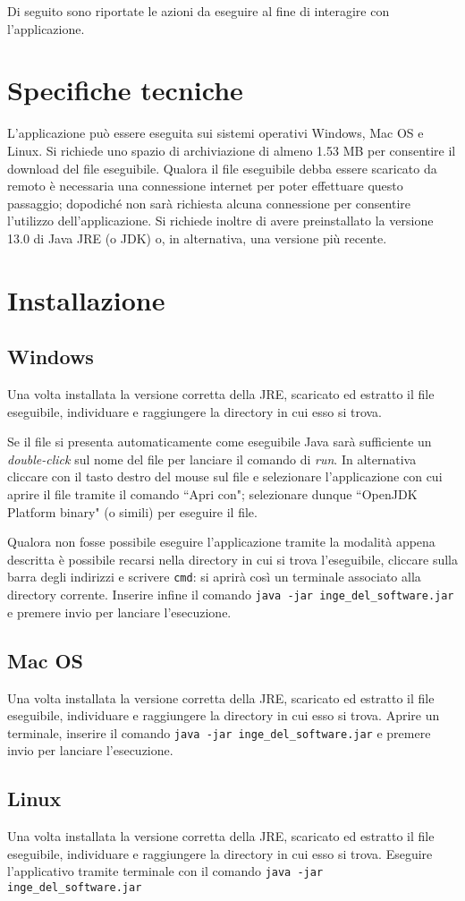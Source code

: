 Di seguito sono riportate le azioni da eseguire al fine di interagire con l'applicazione. 

\section{Specifiche tecniche}
L'applicazione può essere eseguita sui sistemi operativi Windows, Mac OS e Linux.\newline
Si richiede uno spazio di archiviazione di almeno 1.53 MB per consentire il download del file eseguibile. 
Qualora il file eseguibile debba essere scaricato da remoto è necessaria una connessione internet per poter effettuare questo passaggio; dopodiché non sarà richiesta alcuna connessione per consentire l'utilizzo dell'applicazione.\newline
Si richiede inoltre di avere preinstallato la versione 13.0 di Java JRE (o JDK) o, in alternativa, una versione più recente.

\section{Installazione}
\subsection{Windows}
Una volta installata la versione corretta della JRE, scaricato ed estratto il file eseguibile, individuare e raggiungere la directory in cui esso si trova.

Se il file si presenta automaticamente come eseguibile Java sarà sufficiente un \textit{double-click} sul nome del file per lanciare il comando di \textit{run}. In alternativa cliccare con il tasto destro del mouse sul file e selezionare l'applicazione con cui aprire il file tramite il comando ``Apri con"; selezionare dunque ``OpenJDK Platform binary" (o simili) per eseguire il file.\newline

Qualora non fosse possibile eseguire l'applicazione tramite la modalità appena descritta è possibile recarsi nella directory in cui si trova l'eseguibile, cliccare sulla barra degli indirizzi e scrivere \texttt{cmd}: si aprirà così un terminale associato alla directory corrente. Inserire infine il comando \texttt{java -jar inge\_del\_software.jar} e premere invio per lanciare l'esecuzione.


\subsection{Mac OS}
Una volta installata la versione corretta della JRE, scaricato ed estratto il file eseguibile, individuare e raggiungere la directory in cui esso si trova. Aprire un terminale, inserire il comando \texttt{java -jar inge\_del\_software.jar} e premere invio per lanciare l'esecuzione.

\subsection{Linux}
Una volta installata la versione corretta della JRE, scaricato ed estratto il file eseguibile, individuare e raggiungere la directory in cui esso si trova. Eseguire l’applicativo tramite terminale con il comando \texttt{java -jar inge\_del\_software.jar}